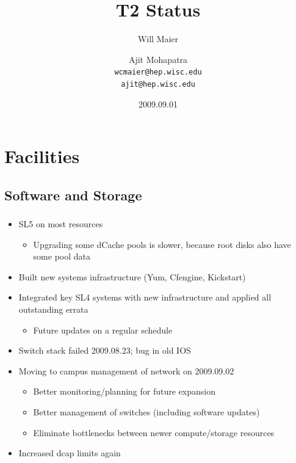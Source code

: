 \documentclass{beamer}
\title{T2 Status}
\author[Maier, Mohapatra]{
    Will Maier \and Ajit Mohapatra\\ 
    {\tt wcmaier@hep.wisc.edu}\\
    {\tt ajit@hep.wisc.edu}}
\institute[Wisconsin]{University of Wisconsin - High Energy Physics}
\date{2009.09.01}
\begin{document}
\begin{frame}
    \titlepage
\end{frame}


\section{Facilities}
\subsection{Software and Storage}
\begin{frame}
\frametitle{}

\begin{itemize}
	\item SL5 on most resources
	\begin{itemize}
		\item Upgrading some dCache pools is slower, because root disks also have some pool data
	\end{itemize}
	\item Built new systems infrastructure (Yum, Cfengine, Kickstart)
	\item Integrated key SL4 systems with new infrastructure and applied all outstanding errata
	\begin{itemize}
		\item Future updates on a regular schedule
	\end{itemize}
	\item Switch stack failed 2009.08.23; bug in old IOS
	\item Moving to campus management of network on 2009.09.02
	\begin{itemize}
		\item Better monitoring/planning for future expansion
		\item Better management of switches (including software updates)
		\item Eliminate bottlenecks between newer compute/storage resources
	\end{itemize}
	\item Increased dcap limits again
\end{itemize}

\end{frame}
\end{document}
